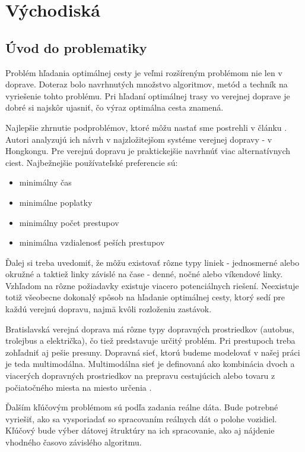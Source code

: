 \chapter{Východiská}
\label{kap:vyc} %

\section{Úvod do problematiky}
\label{sec:intro}
Problém hľadania optimálnej cesty je veľmi rozšíreným problémom nie len v doprave. Doteraz bolo navrhnutých množstvo algoritmov, metód a techník na vyriešenie tohto problému. Pri hľadaní optimálnej trasy vo verejnej doprave je dobré si najskôr ujasniť, čo  výraz optimálna cesta znamená.

Najlepšie zhrnutie podproblémov, ktoré môžu nastať sme postrehli v článku \cite{circular}. 
Autori analyzujú ich návrh v najzložitejšom systéme verejnej dopravy - v Hongkongu. Pre verejnú dopravu je praktickejšie navrhnúť viac alternatívnych ciest. Najbežnejšie používateľské preferencie sú:
\begin{itemize}
\setlength\itemsep{-0.3em}
\item{minimálny čas}
\item{minimálne poplatky}
\item{minimálny počet prestupov}
\item{minimálna vzdialenosť peších prestupov}
\end{itemize}
Ďalej si treba uvedomiť, že môžu existovať rôzne typy liniek - jednosmerné alebo okružné a taktiež linky závislé na čase - denné, nočné alebo víkendové linky. Vzhľadom na rôzne požiadavky existuje viacero potenciálnych riešení. Neexistuje totiž všeobecne dokonalý spôsob na hľadanie optimálnej cesty, ktorý sedí pre každú verejnú dopravu, najmä kvôli rozloženiu zastávok.

Bratislavská verejná doprava má rôzne typy dopravných prostriedkov (autobus, trolejbus a električka), čo tiež predstavuje určitý problém. Pri prestupoch treba zohľadniť aj pešie presuny. Dopravná sieť, ktorú budeme modelovať v našej práci je teda multimodálna. Multimodálna sieť je definovaná ako kombinácia dvoch a viacerých dopravných prostriedkov na prepravu cestujúcich alebo tovaru z počiatočného miesta na miesto určenia \cite{timedependent}.

Ďalším kľúčovým problémom sú podľa zadania reálne dáta. Bude potrebné vyriešiť, ako sa vysporiadať so spracovaním reálnych dát o polohe vozidiel. Kľúčový bude výber dátovej štruktúry na ich spracovanie, ako aj nájdenie vhodného časovo závislého algoritmu.

